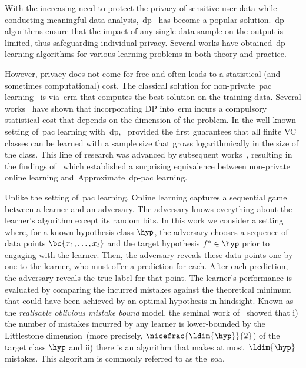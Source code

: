 \glsresetall
With the increasing need to protect the privacy of sensitive user data while conducting meaningful data analysis,~\Gls{dp}~\citep{dwork2006calibrating} has become a popular solution.~\Gls{dp} algorithms ensure that the impact of any single data sample on the output is limited, thus safeguarding individual privacy. Several works have obtained~\Gls{dp} learning algorithms for various learning problems in both theory and practice.

However, privacy does not come for free and often leads to a statistical (and sometimes computational) cost. 
The classical solution for non-private~\Gls{pac} learning~\citep{valiant1984theory} is via~\Gls{erm} that computes the best solution on the training data. Several works~\citep{bassily2014private,chaudhuri2011differentially} have shown that incorporating DP into~\Gls{erm} incurs a compulsory statistical cost that depends on the dimension of the problem. In the well-known setting of~\Gls{pac} learning with~\Gls{dp},~\citet{kasiviswanathan2011can} provided the first guarantees that all finite VC classes can be learned with a sample size that grows logarithmically in the size of the class. This line of research was advanced by subsequent works~\citep{beimel2013characterizing,feldman2014sample,beimel2014bounds}, resulting in the findings of~\citet{alon2022private} which established a surprising equivalence between non-private online learning and~Approximate~\Gls{dp}-\Gls{pac} learning.

Unlike the setting of~\Gls{pac} learning, Online learning captures a sequential game between a learner and an adversary. 
The adversary knows everything about the learner's algorithm except its random bits. 
In this work we consider a setting where, for a known hypothesis class \(\hyp\), the adversary chooses a sequence of data points \(\bc{x_1,\ldots,x_t}\) and the target hypothesis \(f^*\in\hyp\) prior to engaging with the learner. Then, the adversary reveals these data points one by one to the learner, who must offer a prediction for each. After each prediction, the adversary reveals the true label for that point. The learner's performance is evaluated by comparing the incurred mistakes against the theoretical minimum that could have been achieved by an optimal hypothesis in hindsight. Known as the \emph{realisable oblivious mistake bound} model, the seminal work of~\citet{littlestone1988learning} showed that i) the number of mistakes incurred by any learner is lower-bounded by the Littlestone dimension~(more precisely, \(\nicefrac{\ldim{\hyp}}{2}\)) of the target class \(\hyp\) and ii) there is an algorithm that makes at most~\(\ldim{\hyp}\) mistakes. This algorithm is commonly referred to as the~\Gls{soa}.


